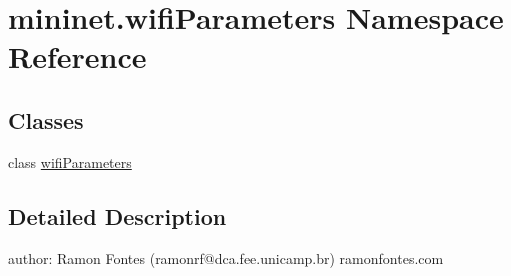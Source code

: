 \hypertarget{namespacemininet_1_1wifiParameters}{\section{mininet.\-wifi\-Parameters Namespace Reference}
\label{namespacemininet_1_1wifiParameters}
}
\subsection*{Classes}
\begin{DoxyCompactItemize}
\item 
class \hyperlink{classmininet_1_1wifiParameters_1_1wifiParameters}{wifi\-Parameters}
\end{DoxyCompactItemize}


\subsection{Detailed Description}
\begin{DoxyVerb}author: Ramon Fontes (ramonrf@dca.fee.unicamp.br)
ramonfontes.com\end{DoxyVerb}
 